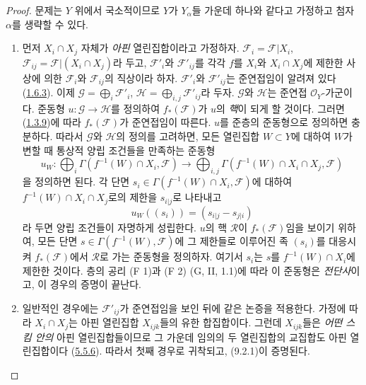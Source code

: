 \begin{proof}
문제는 $Y$ 위에서 국소적이므로 $Y$가 $Y_\alpha$들 가운데 하나와
같다고 가정하고 첨자 $\alpha$를 생략할 수 있다.

\begin{enumerate}
\item[a)] 먼저 $X_i\cap X_j$ 자체가 \emph{아핀} 열린집합이라고
가정하자. $\mathscr{F}_i=\mathscr{F}|X_i$,
$\mathscr{F}_{ij}=\mathscr{F}|(X_i\cap X_j)$라 두고,
$\mathscr{F}'_i$와 $\mathscr{F}'_{ij}$를 각각 $f$를 $X_i$와
$X_i\cap X_j$에 제한한 사상에 의한 $\mathscr{F}_i$와
$\mathscr{F}_{ij}$의 직상이라 하자. $\mathscr{F}'_i$와
$\mathscr{F}'_{ij}$는 준연접임이 알려져 있다
(\hyperref[I.1.6.3-ko]{1.6.3}). 이제
$\mathscr{G}=\bigoplus_i\mathscr{F}'_i$,
$\mathscr{H}=\bigoplus_{i,j}\mathscr{F}'_{ij}$라 두자.
$\mathscr{G}$와 $\mathscr{H}$는 준연접 $\mathscr{O}_Y$-가군이다.
준동형 $u:\mathscr{G}\to\mathscr{H}$를 정의하여
$f_*(\mathscr{F})$가 $u$의 \emph{핵}이 되게 할 것이다. 그러면
(\hyperref[I.1.3.9-ko]{1.3.9})에 따라 $f_*(\mathscr{F})$가 준연접임이
따른다. $u$를
준층의 준동형으로 정의하면 충분하다. 따라서 $\mathscr{G}$와
$\mathscr{H}$의 정의를 고려하면, 모든 열린집합 $W\subset Y$에 대하여
$W$가 변할 때 통상적 양립 조건들을 만족하는 준동형
\[
  u_W:\bigoplus_i\Gamma(f^{-1}(W)\cap X_i,\mathscr{F})
  \longrightarrow
  \bigoplus_{i,j}\Gamma(f^{-1}(W)\cap X_i\cap X_j,\mathscr{F})
\]
을 정의하면 된다. 각 단면
$s_i\in\Gamma(f^{-1}(W)\cap X_i,\mathscr{F})$에 대하여
$f^{-1}(W)\cap X_i\cap X_j$로의 제한을 $s_{i|j}$로 나타내고
\[
  u_W((s_i))=(s_{i|j}-s_{j|i})
\]
라 두면 양립 조건들이 자명하게 성립한다. $u$의 핵 $\mathscr{R}$이
$f_*(\mathscr{F})$임을 보이기 위하여, 모든 단면
$s\in\Gamma(f^{-1}(W),\mathscr{F})$에 그 제한들로 이루어진 족
$(s_i)$를 대응시켜 $f_*(\mathscr{F})$에서 $\mathscr{R}$로 가는
준동형을 정의하자. 여기서 $s_i$는 $s$를
$f^{-1}(W)\cap X_i$에 제한한 것이다. 층의 공리 (F 1)과 (F 2)
(G, II, 1.1)에 따라 이 준동형은 \emph{전단사}이고, 이 경우의 증명이
끝난다.

\item[b)] 일반적인 경우에는 $\mathscr{F}'_{ij}$가 준연접임을 보인
뒤에 같은 논증을 적용한다. 가정에 따라 $X_i\cap X_j$는 아핀
열린집합 $X_{ijk}$들의 유한 합집합이다. 그런데 $X_{ijk}$들은
\emph{어떤 스킴 안의} 아핀 열린집합들이므로 그 가운데 임의의 두
열린집합의 교집합도 아핀 열린집합이다
(\hyperref[I.5.5.6-ko]{5.5.6}). 따라서 첫째 경우로 귀착되고,
(9.2.1)이 증명된다.
\end{enumerate}
\end{proof}

